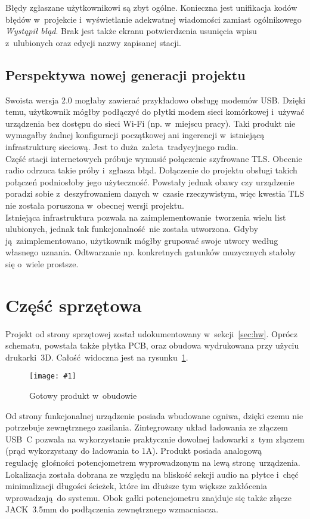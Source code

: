 \documentclass[polish]{aghengthesis}
\newcommand{\imgint}[4]{
	\begin{figure}[{#4}]
		\centering
		\texttt{[image: \#1]}
		\caption{#2}
		\label{#1}
	\end{figure}
}
\newcommand{\imgh}[3]{\imgint{#1}{#2}{#3}{H}}
\begin{document}
			Błędy zgłaszane użytkownikowi są zbyt ogólne. Konieczna jest unifikacja kodów błędów w~projekcie i~wyświetlanie adekwatnej wiadomości zamiast ogólnikowego \textit{Wystąpił błąd}. Brak jest także ekranu potwierdzenia usunięcia wpisu z~ulubionych oraz edycji nazwy zapisanej stacji.
		
		\subsection{Perspektywa nowej generacji projektu}
			Swoista wersja 2.0 mogłaby zawierać przykładowo obsługę modemów USB. Dzięki temu, użytkownik mógłby podłączyć do płytki modem sieci komórkowej i~używać urządzenia bez dostępu do sieci Wi-Fi (np. w~miejscu pracy). Taki produkt nie wymagałby żadnej konfiguracji początkowej ani ingerencji w~istniejącą infrastrukturę sieciową. Jest to duża zaleta tradycyjnego radia.
			$ $\\
			
			Część stacji internetowych próbuje wymusić połączenie szyfrowane TLS. Obecnie radio odrzuca takie próby i~zgłasza błąd. Dołączenie do projektu obsługi takich połączeń podniosłoby jego użyteczność. Powstały jednak obawy czy urządzenie poradzi sobie z~deszyfrowaniem danych w~czasie rzeczywistym, więc kwestia TLS nie została poruszona w~obecnej wersji projektu.
			$ $\\
			
			Istniejąca infrastruktura pozwala na zaimplementowanie tworzenia wielu list ulubionych, jednak tak funkcjonalność nie została utworzona. Gdyby ją zaimplementowano, użytkownik mógłby grupować swoje utwory według własnego uznania. Odtwarzanie np. konkretnych gatunków muzycznych stałoby się o~wiele prostsze.
			
	\section{Część sprzętowa}
		Projekt od strony sprzętowej został udokumentowany w~sekcji~\ref{sec:hw}. Oprócz schematu, powstała także płytka PCB, oraz obudowa wydrukowana przy użyciu drukarki~3D. Całość widoczna jest na rysunku~\ref{5/hw_result}.
		
		\imgh{5/hw_result}{Gotowy produkt w~obudowie}{0.7}
		
		Od strony funkcjonalnej urządzenie posiada wbudowane ogniwa, dzięki czemu nie potrzebuje zewnętrznego zasilania. Zintegrowany układ ładowania ze złączem USB~C pozwala na wykorzystanie praktycznie dowolnej ładowarki z~tym złączem (prąd wykorzystany do ładowania to 1A). Produkt posiada analogową regulację głośności potencjometrem wyprowadzonym na lewą stronę urządzenia. Lokalizacja została dobrana ze względu na bliskość sekcji audio na płytce i~chęć minimalizacji długości ścieżek, które im dłuższe tym większe zakłócenia wprowadzają do systemu. Obok gałki potencjometru znajduje się także złącze JACK~3.5mm do podłączenia zewnętrznego wzmacniacza.
		
\end{document}
